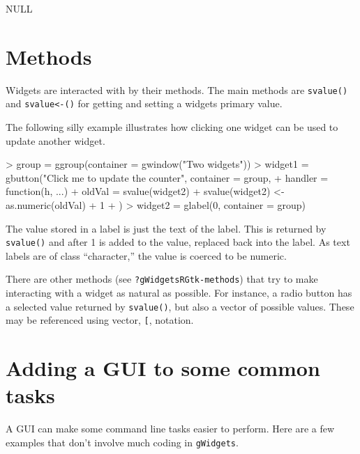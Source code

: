 \documentclass[12pt]{article}
\newcommand{\RCode}[1]{\texttt{#1}}
\newcommand{\RFunc}[1]{\texttt{#1()}}
\begin{document}
\begin{Schunk}
\begin{Soutput}
NULL
\end{Soutput}
\end{Schunk}

\section{Methods}

Widgets are interacted with by their methods. The main methods are
\RFunc{svalue} and \RFunc{svalue<-} for getting and setting a widgets
primary value. 

The following silly example illustrates how clicking one widget can be
used to update another widget.
\begin{Schunk}
\begin{Sinput}
> group = ggroup(container = gwindow("Two widgets"))
> widget1 = gbutton("Click me to update the counter", container = group, 
+     handler = function(h, ...) {
+         oldVal = svalue(widget2)
+         svalue(widget2) <- as.numeric(oldVal) + 1
+     })
> widget2 = glabel(0, container = group)
\end{Sinput}
\end{Schunk}
The value stored in a label is just the text of the label. This is
returned by \RFunc{svalue} and after 1 is added to the value, replaced
back into the label. As text labels are of class ``character,'' the
value is coerced to be numeric.

There are other methods (see \RCode{?gWidgetsRGtk-methods}) that try
to make interacting with a widget as natural as possible. For
instance, a radio button has a selected value returned by
\RFunc{svalue}, but also a vector of possible values. These may be
referenced using vector, \RCode{[}, notation.

\section{Adding a GUI to some common  tasks}

A GUI can make some command line tasks easier to perform. Here are a
few examples that don't involve much coding in \RCode{gWidgets}.
\end{document}
